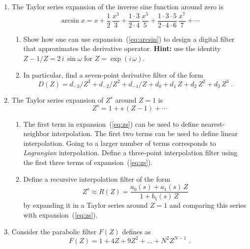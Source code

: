 \begin{enumerate}

\item The Taylor series expansion of the inverse sine function around zero is
\begin{equation}
  \label{eq:arcsin}
  \arcsin{x} = x + \frac{1}{2}\,\frac{x^3}{3} + 
  \frac{1 \cdot 3}{2 \cdot 4}\,\frac{x^5}{5} + 
  \frac{1 \cdot 3 \cdot 5}{2 \cdot 4 \cdot 6}\,\frac{x^7}{7} + 
  \cdots
\end{equation}
\begin{enumerate}
\item Show how one can use expansion~(\ref{eq:arcsin}) to design a
  digital filter that approximates the derivative
  operator. \textbf{Hint:} use the identity $Z-1/Z =
  2\,i\,\sin{\omega}$ for $Z = \exp{(i\,\omega)}$.
\item In particular, find a seven-point derivative filter of the form
\begin{equation}
  \label{eq:d6}
  D(Z) = d_{-3}/Z^{3} + d_{-2}/Z^{2} + d_{-1}/Z + d_0 + 
  d_1\,Z + d_2\,Z^2 + d_3\,Z^3\;.
\end{equation}
\end{enumerate}

\item The Taylor series expansion of $Z^s$ around $Z=1$ is
\begin{equation}
  \label{eq:zs}
  Z^s = 1 + s\,(Z-1) + \cdots  
\end{equation}
\begin{enumerate}
\item The first term in expansion~(\ref{eq:zs}) can be used to
  define nearest-neighbor interpolation. The first two terms can be
  used to define linear interpolation. Going to a larger number of
  terms corresponds to \emph{Lagrangian} interpolation. Define a
  three-point interpolation filter using the first three terms of
  expansion~(\ref{eq:zs}).
\item Define a recursive interpolation filter of the form
\begin{equation}
  \label{eq:rec}
  Z^s \approx R(Z) = \frac{a_0(s) + a_1(s)\,Z}{1 + b_1(s)\,Z}
\end{equation}
by expanding it in a Taylor series around $Z=1$ and comparing this
series with expansion~(\ref{eq:zs}).
\end{enumerate}

\item Consider the parabolic filter $F(Z)$ defines as
\begin{equation}
\label{eq:parab}
F(Z) = 1 + 4 Z + 9 Z^2 + \ldots + N^2 Z^{N-1}\;.
\end{equation} 


\end{enumerate}
